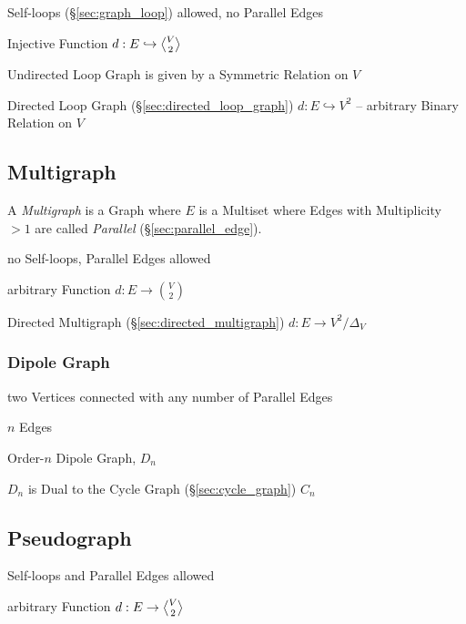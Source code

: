 Self-loops (\S\ref{sec:graph_loop}) allowed, no Parallel Edges

Injective Function $d : E \hookrightarrow \angleover{V}{2}$

Undirected Loop Graph is given by a Symmetric Relation on $V$

Directed Loop Graph (\S\ref{sec:directed_loop_graph}) $d : E
\hookrightarrow V^2$ -- arbitrary Binary Relation on $V$



\subsection{Multigraph}\label{sec:multigraph}

A \emph{Multigraph} is a Graph where $E$ is a Multiset where Edges
with Multiplicity $>1$ are called \emph{Parallel}
(\S\ref{sec:parallel_edge}).

no Self-loops, Parallel Edges allowed

arbitrary Function $d : E \rightarrow {V \choose 2}$

Directed Multigraph (\S\ref{sec:directed_multigraph}) $d : E
\rightarrow V^2 / \Delta_V$



\subsubsection{Dipole Graph}\label{sec:dipole_graph}

two Vertices connected with any number of Parallel Edges

$n$ Edges

Order-$n$ Dipole Graph, $D_n$

$D_n$ is Dual to the Cycle Graph (\S\ref{sec:cycle_graph}) $C_n$



\subsection{Pseudograph}\label{sec:pseudograph}

Self-loops and Parallel Edges allowed

arbitrary Function $d : E \rightarrow \angleover{V}{2}$

